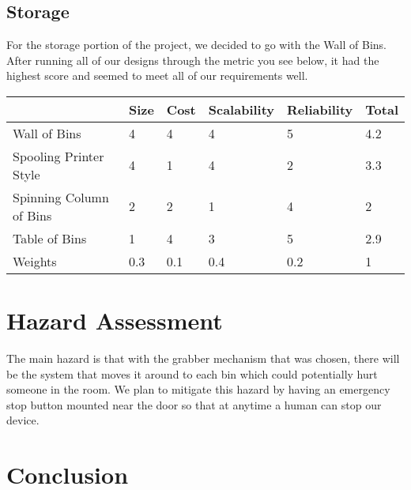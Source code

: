 \documentclass[12pt]{report}
\begin{document}

\subsection*{Storage}

For the storage portion of the project, we decided to go with the Wall of Bins. After running all of our designs through the metric you see below, it had the highest score and seemed to meet all of our requirements well.


\begin{minipage}{\linewidth}
\centering
{} \label{tab:grabber} 
\begin{tabular}{|l|l|l|l|l|l|}
\hline
 & Size & Cost & Scalability & Reliability & Total \\
 \hline
 \rowcolor{green}
Wall of Bins & 4 & 4 & 4 & 5 & 4.2 \\
Spooling Printer Style & 4 & 1 & 4 & 2 & 3.3 \\
Spinning Column of Bins & 2 & 2 & 1 & 4 & 2 \\
Table of Bins & 1 & 4 & 3 & 5 & 2.9 \\
Weights & 0.3 & 0.1 & 0.4 & 0.2 & 1 \\
\hline
\end{tabular}
\end{minipage}



\section*{Hazard Assessment}

The main hazard is that with the grabber mechanism that was chosen, there will be the system that moves it around to each bin which could potentially hurt someone in the room. We plan to mitigate this hazard by having an emergency stop button mounted near the door so that at anytime a human can stop our device.  

\section*{Conclusion}
\end{document}
